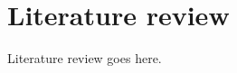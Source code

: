 \chapter{Literature review}

\ifpdf
    \graphicspath{{Chapter3/Figs/Raster/}{Chapter3/Figs/PDF/}{Chapter3/Figs/}}
\else
    \graphicspath{{Chapter3/Figs/Vector/}{Chapter3/Figs/}}
\fi

Literature review goes here.